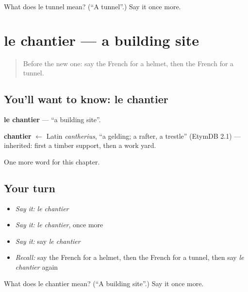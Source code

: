 \begin{tcolorbox}[breakable,colback=teal!4,colframe=teal!35!black,title={Before you move on}]
What does le tunnel mean? (\textquotedblleft{}A tunnel\textquotedblright{}.) Say it once more.
\end{tcolorbox}
\section[le chantier]{le chantier — a building site}

\label{lesson:FR-C253-chantier}



\begin{quote}
Before the new one: say the French for a helmet, then the French for a tunnel.
\end{quote}

\subsection*{You'll want to know: le chantier}
\textbf{le chantier} — \textquotedblleft{}a building site\textquotedblright{}.

\begin{cousinweb}
\textbf{chantier} $\leftarrow$ Latin \emph{cantherius}, \textquotedblleft{}a gelding; a rafter, a trestle\textquotedblright{} (EtymDB 2.1) — inherited: first a timber support, then a work yard.
\end{cousinweb}

\begin{grammarlens}[title={What you've built}]
One more word for this chapter.
\end{grammarlens}

\subsection*{Your turn}
\begin{itemize}
\raggedright
  \item \emph{Say it:} \emph{le chantier}
  \item \emph{Say it:} \emph{le chantier}, once more
  \item \emph{Say it:} say \emph{le chantier}
  \item \emph{Recall:} say the French for a helmet, then the French for a tunnel, then say \emph{le chantier} again
\end{itemize}

\begin{tcolorbox}[breakable,colback=teal!4,colframe=teal!35!black,title={Before you move on}]
What does le chantier mean? (\textquotedblleft{}A building site\textquotedblright{}.) Say it once more.
\end{tcolorbox}
